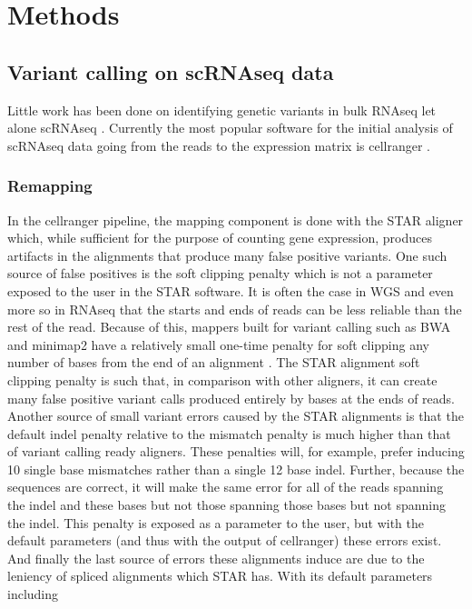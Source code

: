 \section{Methods} %
\subsection{Variant calling on scRNAseq data}
Little work has been done on identifying genetic variants in bulk RNAseq \cite{RNAvariant} let alone scRNAseq \cite{vartrix}. 
Currently the most popular software for the initial analysis of scRNAseq data going from the reads to the expression matrix is cellranger \cite{10xsinglecell}. 


\subsubsection{Remapping}
In the cellranger pipeline, the mapping component is done with the STAR aligner \cite{STAR} which, while sufficient for the purpose 
of counting gene expression, produces artifacts in the alignments that produce many false positive variants. One such source of false positives is the 
soft clipping penalty which is not a parameter exposed to the user in the STAR software. It is often the case in WGS and even more so in RNAseq that the starts and ends of
reads can be less reliable than the rest of the read. Because of this, mappers built for variant calling such as BWA \cite{bwa} and minimap2 \cite{minimap2} have 
a relatively small one-time penalty for soft clipping any number of bases from the end of an alignment \cite{variantartifacts}. The STAR alignment soft clipping penalty is such that, in 
comparison with other aligners, it can create many false positive variant calls produced entirely by bases at the ends of reads. Another source of 
small variant errors caused by the STAR alignments is that the default indel penalty relative to the mismatch penalty is much higher than that of 
variant calling ready aligners. These penalties will, for example, prefer inducing 10 single base mismatches rather than a single 12 base indel. Further, because the 
sequences are correct, it will make the same error for all of the reads spanning the indel and these bases but not those spanning those bases but not spanning the indel. 
This penalty is exposed as a parameter to the user, but with the default parameters (and thus with the output of cellranger) these errors exist. 
And finally the last source of errors these alignments induce are due to the leniency of spliced alignments which STAR has. With its default parameters including 
